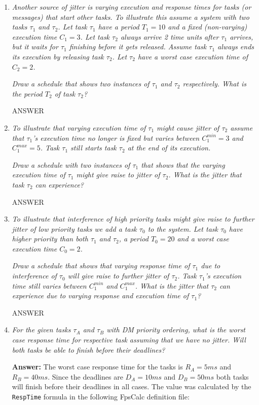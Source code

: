 \documentclass[a4paper,10pt]{article}
\newcommand{\answer}{\textbf{Answer: }}
\begin{document}
\begin{enumerate}
	\item \emph{Another source of jitter is varying execution and response times for tasks (or messages) that start other tasks. To illustrate this assume a system with two tasks $\tau_1$ and $\tau_2$. Let task $\tau_1$ have a period $T_1 = 10$ and a fixed (non-varying) execution time $C_1 = 3$. Let task $\tau_2$ always arrive 2 time units after $\tau_1$ arrives, but it waits for $\tau_1$ finishing before it gets released. Assume task $\tau_1$ always ends its execution by releasing task $\tau_2$. Let $\tau_2$ have a worst case execution time of $C_2 = 2$.}
	
	\emph{Draw a schedule that shows two instances of $\tau_1$ and $\tau_2$ respectively. What is the period $T_2$ of task $\tau_2$?}
	
	ANSWER
	\item \emph{To illustrate that varying execution time of $\tau_1$ might cause jitter of $\tau_2$ assume that $\tau_1$'s execution time no longer is fixed but varies between $C_1^{min} = 3$ and $C_1^{max} = 5$. Task $\tau_1$ still starts task $\tau_2$ at the end of its execution.}

	\emph{Draw a schedule with two instances of $\tau_1$ that shows that the varying execution time of $\tau_1$ might give raise to jitter of $\tau_2$. What is the jitter that task $\tau_2$ can experience?}
	
	ANSWER
	\item \emph{To illustrate that interference of high priority tasks might give raise to further jitter of low priority tasks we add a task $\tau_0$ to the system. Let task $\tau_0$ have higher priority than both $\tau_1$ and $\tau_2$, a period $T_0 = 20$ and a worst case execution time $C_0 = 2$.}
	
	\emph{Draw a schedule that shows that varying response time of $\tau_1$ due to interference of $\tau_0$ will give raise to further jitter of $\tau_2$. Task $\tau_1$'s execution time still varies between $C_1^{min}$ and $C_1^{max}$. What is the jitter that $\tau_2$ can experience due to varying response and execution time of $\tau_1$?}
	
	ANSWER
	\item \emph{For the given tasks $\tau_A$ and $\tau_B$ with DM priority ordering, what is the worst case response time for respective task assuming that we have no jitter. Will both tasks be able to finish before their deadlines?}
	
	\answer The worst case response time for the tasks is $R_A = 5 ms$ and $R_B = 40 ms$. Since the deadlines are $D_A = 10 ms$ and $D_B = 50 ms$ both tasks will finish before their deadlines in all cases. The value was calculated by the \texttt{RespTime} formula in the following FpsCalc definition file:


\end{enumerate}
\end{document}

